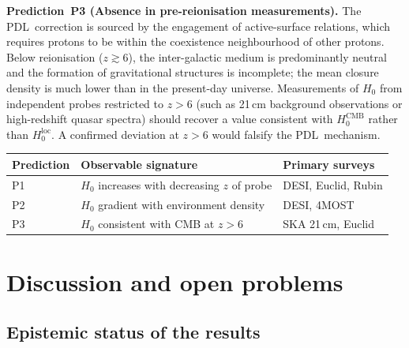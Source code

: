 \documentclass[11pt,a4paper]{article}
\theoremstyle{definition}
\newcommand{\PDL}{\textnormal{PDL}}
\newcommand{\Hzero}{H_0}
\newcommand{\HCMB}{H_0^{\mathrm{CMB}}}
\newcommand{\Hloc}{H_0^{\mathrm{loc}}}
\begin{document}
\medskip\noindent\textbf{Prediction~P3 (Absence in pre-reionisation measurements).} The \PDL\ correction is sourced by the engagement of active-surface relations, which requires protons to be within the coexistence neighbourhood of other protons. Below reionisation ($z \gtrsim 6$), the inter-galactic medium is predominantly neutral and the formation of gravitational structures is incomplete; the mean closure density is much lower than in the present-day universe. Measurements of $\Hzero$ from independent probes restricted to $z > 6$ (such as 21\,cm background observations or high-redshift quasar spectra) should recover a value consistent with $\HCMB$ rather than $\Hloc$. A confirmed deviation at $z > 6$ would falsify the \PDL\ mechanism.

\begin{center}
\begin{tabular}{lll}
\toprule
Prediction & Observable signature & Primary surveys \\
\midrule
P1 & $\Hzero$ increases with decreasing $z$ of probe & DESI, Euclid, Rubin \\
P2 & $\Hzero$ gradient with environment density & DESI, 4MOST \\
P3 & $\Hzero$ consistent with CMB at $z > 6$ & SKA 21\,cm, Euclid \\
\bottomrule
\end{tabular}
\end{center}

\section{Discussion and open problems}
\label{sec:discussion}

\subsection{Epistemic status of the results}
\label{subsec:status}
\end{document}
